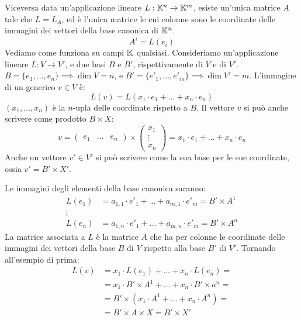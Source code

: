 Viceversa data un'applicazione lineare $L : \mathbb{K}^n \to \mathbb{K}^m$, esiste un'unica matrice $A$ tale che $L = L_A$, ed \`e l'unica matrice le cui colonne sono le coordinate delle immagini dei vettori della base canonica di $\mathbb{K}^n$.
\[
A^i = L(e_i)
\]
Vediamo come funziona su campi $\mathbb{K}$ qualsiasi. Consideriamo un'applicazione lineare $L : V \to V'$, e due basi $B$ e $B'$, rispettivamente di $V$ e di $V'$. $B = \{ e_{1}, \ldots, e_{n} \} \implies \dim V = n$, e $B' = \{ {e'}_{1}, \ldots, {e'}_{m} \} \implies \dim V' = m$. L'immagine di un generico $v \in V$ \`e:
\[
L(v) = L(x_1 \cdot e_1 + \ldots + x_n \cdot e_n)
\]
$(x_{1}, \ldots, x_{n})$ \`e la $n$-upla delle coordinate rispetto a $B$. Il vettore $v$ si pu\`o anche scrivere come prodotto $B \times X$:
\[
v = 
\begin{pmatrix}
e_1 & \dots & e_n
\end{pmatrix} 
\times 
\begin{pmatrix}
x_1 \\ \vdots \\ x_n 
\end{pmatrix}
= x_1 \cdot e_1 + \ldots + x_n \cdot e_n
\]
Anche un vettore $v' \in V'$ si pu\`o scrivere come la sua base per le sue coordinate, ossia $v' = B' \times X'$.

Le immagini degli elementi della base canonica saranno:
\begin{align*}
L(e_1) &= a_{1,1} \cdot {e'}_{1} + \ldots + a_{m,1} \cdot {e'}_{m} = B' \times A^1 \\
\vdots & \\
L(e_n) &= a_{1,n} \cdot {e'}_{1} + \ldots + a_{m,n} \cdot {e'}_{m} = B' \times A^n
\end{align*}
La matrice associata a $L$ \`e la matrice $A$ che ha per colonne le coordinate delle immagini dei vettori della base $B$ di $V$ rispetto alla base $B'$ di $V'$. Tornando all'esempio di prima:
\begin{align*}
L(v) &= x_1 \cdot L(e_1) + \ldots + x_n \cdot L(e_n) = \\
&= x_1 \cdot B' \times A^1 + \ldots + x_n \cdot B' \times a^n = \\
&= B' \times (x_1 \cdot A^1 + \ldots + x_n \cdot A^n) = \\
&= B' \times A \times X = B' \times X' \tag{$A \times X = X'$}
\end{align*}

